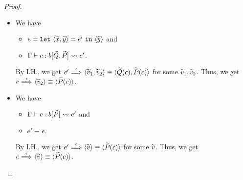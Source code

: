 \begin{proof}
\begin{itemize}
\item[] 
We have
\begin{itemize}
\item \(e=\mathtt{let~}\langle{\widetilde{x},\widetilde{y}}\rangle=e'\mathtt{~in~}{\langle{\widetilde{y}}\rangle}\) and
\item \(\Gamma \vdash c : b[\widetilde{Q},\widetilde{P}] \leadsto e'\).
\end{itemize}
By I.H., we get \(e' \stackrel{\epsilon}{\Longrightarrow}_{} \langle{\widetilde{v}_1,\widetilde{v}_2}\rangle \equiv \langle{\widetilde{Q}(c),\widetilde{P}(c)}\rangle\) for some \(\widetilde{v}_1,\widetilde{v}_2\).
Thus, we get \(e \stackrel{\epsilon}{\Longrightarrow}_{} \langle{\widetilde{v}_2}\rangle \equiv \langle{\widetilde{P}(c)}\rangle\).

\item[] 
We have
\begin{itemize}
\item \(\Gamma \vdash c : b[\widetilde{P}] \leadsto e'\) and
\item \(e' \equiv e\).
\end{itemize}
By I.H., we get \(e' \stackrel{\epsilon}{\Longrightarrow}_{} \langle{\widetilde{v}}\rangle \equiv \langle{\widetilde{P}(c)}\rangle\) for some \(\widetilde{v}\).
Thus, we get \(e \stackrel{\epsilon}{\Longrightarrow}_{} \langle{\widetilde{v}}\rangle \equiv \langle{\widetilde{P}(c)}\rangle\).

\end{itemize}
\end{proof}


